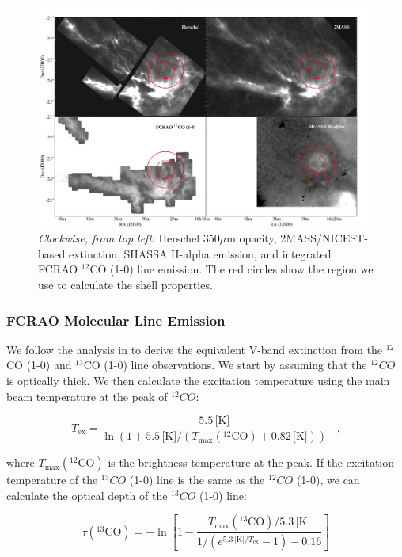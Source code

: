 \documentclass[11pt,a4paper]{emulateapj}
\begin{document}
\begin{figure}[ht]
\centering
\includegraphics[scale=0.3]{fig/footprint.png}
\caption{{\it Clockwise, from top left}: Herschel 350$\mu$m opacity, 2MASS/NICEST-based extinction, SHASSA H-alpha emission, and integrated FCRAO $^{12}$CO (1-0) line emission. The red circles show the region we use to calculate the shell properties.
}
\end{figure}

\subsubsection{FCRAO Molecular Line Emission}
We follow the analysis in \citet{Pineda_2008} to derive the equivalent V-band extinction from the $^{12}$CO (1-0) and $^{13}$CO (1-0) line observations. We start by assuming that the $^{12}CO$ is optically thick. We then calculate the excitation temperature using the main beam temperature at the peak of $^{12}CO$:

\begin{equation}
T_{\text{ex}} = \frac{5.5\,\text{[K]}}{\ln{\left(1+5.5\,\text{[K]}/\left(T_{\text{max}}(^{12}\text{CO})+0.82\,\text{[K]}\right)\right)}}\;\;\;\text{,}
\end{equation}

where $T_{\text{max}}(^{12}\text{CO})$ is the brightness temperature at the peak. If the excitation temperature of the $^{13}CO$ (1-0) line is the same as the $^{12}CO$ (1-0), we can calculate the optical depth of the $^{13}CO$ (1-0) line:

\begin{equation}
\tau(^{13}\text{CO}) = - \ln\left[1 - \frac{T_{\text{max}}(^{13}\text{CO})/5.3\,\text{[K]}}{1/\left(e^{5.3\,\text{[K]}/T_{\text{ex}}}-1\right) - 0.16}\right]
\end{equation}
\end{document}
